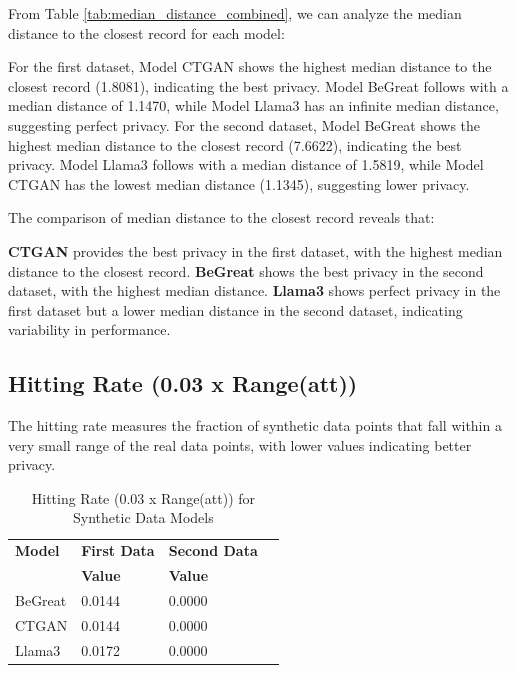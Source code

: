 From Table \ref{tab:median_distance_combined}, we can analyze the median distance to the closest record for each model:

For the first dataset, Model CTGAN shows the highest median distance to the closest record (1.8081), indicating the best privacy. Model BeGreat follows with a median distance of 1.1470, while Model Llama3 has an infinite median distance, suggesting perfect privacy.
For the second dataset, Model BeGreat shows the highest median distance to the closest record (7.6622), indicating the best privacy. Model Llama3 follows with a median distance of 1.5819, while Model CTGAN has the lowest median distance (1.1345), suggesting lower privacy.

The comparison of median distance to the closest record reveals that:

\textbf{CTGAN} provides the best privacy in the first dataset, with the highest median distance to the closest record.
\textbf{BeGreat} shows the best privacy in the second dataset, with the highest median distance.
\textbf{Llama3} shows perfect privacy in the first dataset but a lower median distance in the second dataset, indicating variability in performance.





\subsection{Hitting Rate (0.03 x Range(att))}

The hitting rate measures the fraction of synthetic data points that fall within a very small range of the real data points, with lower values indicating better privacy.

\begin{table}[H]
\centering
\caption{Hitting Rate (0.03 x Range(att)) for Synthetic Data Models}
\label{tab:hitting_rate_combined}
\begin{tabularx}{\textwidth}{l*{5}{X}}
    \toprule
    \textbf{Model} & \multicolumn{2}{c}{\textbf{First Data}} & \multicolumn{2}{c}{\textbf{Second Data}} \\
    \cmidrule(lr){2-3} \cmidrule(lr){4-5}
    & \textbf{Value} & & \textbf{Value} \\
    \midrule
    BeGreat & 0.0144 & & 0.0000 \\
    CTGAN & 0.0144 & & 0.0000 \\
    Llama3 & 0.0172 & & 0.0000 \\
    \bottomrule
\end{tabularx}
\end{table}



